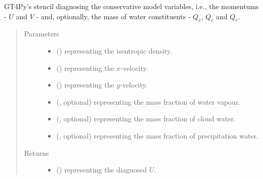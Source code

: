 \documentclass[letterpaper,10pt,english]{sphinxmanual}
\begin{document}
\begin{fulllineitems}
\begin{fulllineitems}
\label{\detokenize{api:dycore.diagnostic_isentropic.DiagnosticIsentropic._defs_stencil_diagnosing_conservative_variables}}
GT4Py’s stencil diagnosing the conservative model variables, i.e., the momentums - \(U\) and \(V\) -
and, optionally, the mass of water constituents - \(Q_v\), \(Q_c\) and \(Q_r\).
\begin{quote}\begin{description}
\item[{Parameters}] \leavevmode\begin{itemize}
\item {} 
 () \textendash{}  representing the isentropic density.

\item {} 
 () \textendash{}  representing the \(x\)-velocity.

\item {} 
 () \textendash{}  representing the \(y\)-velocity.

\item {} 
 (, optional) \textendash{}  representing the mass fraction of water vapour.

\item {} 
 (, optional) \textendash{}  representing the mass fraction of cloud water.

\item {} 
 (, optional) \textendash{}  representing the mass fraction of precipitation water.

\end{itemize}

\item[{Returns}] \leavevmode
\begin{itemize}
\item {} 
 () \textendash{}  representing the diagnosed \(U\).


\end{itemize}
\end{description}
\end{quote}
\end{fulllineitems}
\end{fulllineitems}
\end{document}
